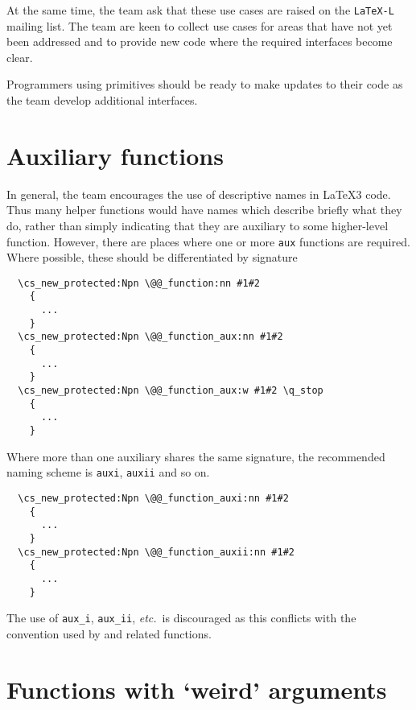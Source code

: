\documentclass{l3doc}
\begin{document}
At the same time, the team ask that these use cases are raised on the
\texttt{LaTeX-L} mailing list. The team are keen to collect use cases for
areas that have not yet been addressed and to provide new code where the
required interfaces become clear.

Programmers using primitives should be ready to make updates to their
code as the team develop additional interfaces.

\section{Auxiliary functions}

In general, the team encourages the use of descriptive names in \LaTeX3 code.
Thus many helper functions would have names which describe briefly what they do,
rather than simply indicating that they are auxiliary to some higher-level
function. However, there are places where one or more \texttt{aux} functions
are required. Where possible, these should be differentiated by signature
\begin{verbatim}
  \cs_new_protected:Npn \@@_function:nn #1#2
    {
      ...
    }
  \cs_new_protected:Npn \@@_function_aux:nn #1#2
    {
      ...
    }
  \cs_new_protected:Npn \@@_function_aux:w #1#2 \q_stop
    {
      ...
    }
\end{verbatim}
Where more than one auxiliary shares the same signature, the recommended naming
scheme is \texttt{auxi}, \texttt{auxii} and so on.
\begin{verbatim}
  \cs_new_protected:Npn \@@_function_auxi:nn #1#2
    {
      ...
    }
  \cs_new_protected:Npn \@@_function_auxii:nn #1#2
    {
      ...
    }
\end{verbatim}
The use of \texttt{aux_i}, \texttt{aux_ii}, \emph{etc.}\ is discouraged as this
conflicts with the convention used by  and related functions.

\section{Functions with `weird' arguments}
\end{document}
